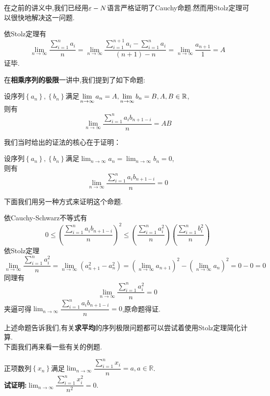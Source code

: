 \documentclass[a4paper]{ctexart}
\begin{document}
在之前的讲义中,我们已经用$\varepsilon-N$语言严格证明了Cauchy命题.然而用Stolz定理可以很快地解决这一问题.
\begin{solution}
    依Stolz定理有$$\lim_{n\to\infty}{\dfrac{\sum_{i=1}^{n}{a_i}}{n}}=\lim_{n\to\infty}{\dfrac{\sum_{i=1}^{n+1}{a_i}-\sum_{i=1}^{n}{a_i}}{(n+1)-n}}=\lim_{n\to\infty}{\dfrac{a_{n+1}}{1}}=A$$
    证毕.
\end{solution}\noindent
在\textbf{\songti 相乘序列的极限}一讲中,我们提到了如下命题:
\begin{formal}
    设序列$\left\{a_n\right\},\left\{b_n\right\}$满足$\displaystyle\lim_{n\to\infty}{a_n}=A,\lim_{n\to\infty}{b_n}=B,A,B\in\mathbb{R}$,\\
    则有$$\lim_{n\to\infty}{\dfrac{\sum_{i=1}^{n}{a_ib_{n+1-i}}}{n}}=AB$$
\end{formal}\noindent
我们当时给出的证法的核心在于证明：
\begin{formal}
    设序列$\left\{a_n\right\},\left\{b_n\right\}$满足$\displaystyle\lim_{n\to\infty}{a_n}=\lim_{n\to\infty}{b_n}=0$,\\
    则有$$\lim_{n\to\infty}{\dfrac{\sum_{i=1}^{n}{a_ib_{n+1-i}}}{n}}=0$$
\end{formal}\noindent
下面我们用另一种方式来证明这个命题.
\begin{solution}
    依Cauchy-Schwarz不等式有
    $$0\leqslant\left(\dfrac{\sum_{i=1}^{n}{a_ib_{n+1-i}}}{n}\right)^2\leqslant\left(\dfrac{\sum_{i=1}^n{a_i^2}}{n}\right)\left(\dfrac{\sum_{i=1}^n{b_i^2}}{n}\right)$$
    依Stolz定理$$\lim_{n\to\infty}\dfrac{\sum_{i=1}^n{a_i^2}}{n}=\lim_{n\to\infty}{\left(a_{n+1}^2-a_n^2\right)}=\left(\lim_{n\to\infty}{a_{n+1}}\right)^2-\left(\lim_{n\to\infty}{a_n}\right)^2=0-0=0$$
    同理有$$\lim_{n\to\infty}\dfrac{\sum_{i=1}^n{a_i^2}}{n}=0$$
    夹逼可得$\lim_{n\to\infty}{\dfrac{\sum_{i=1}^{n}{a_ib_{n+1-i}}}{n}}=0$,原命题得证.
\end{solution}\noindent
上述命题告诉我们,有关\textbf{\songti 求平均}的序列极限问题都可以尝试着使用Stolz定理简化计算.\\
下面我们再来看一些有关的例题.
\begin{problem}
    正项数列$\left\{ x_n\right\}$满足$\displaystyle\lim_{n\to\infty}{\dfrac{\sum_{i=1}^{n}{x_i}}{n}}=a,a\in\mathbb{R}$.\\
    \textbf{试证明:}$\displaystyle\lim_{n\to\infty}{\dfrac{\sum_{i=1}^{n}{x_i^2}}{n^2}}=0$.
\end{problem}
\end{document}
